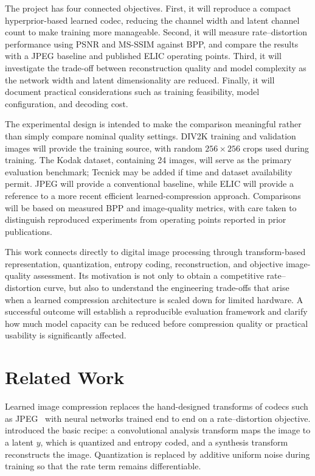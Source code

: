 \documentclass[11pt]{article}
\begin{document}
The project has four connected objectives. First, it will reproduce
a compact hyperprior-based learned codec, reducing the channel width
and latent channel count to make training more manageable. Second,
it will measure rate--distortion performance using PSNR and MS-SSIM
against BPP, and compare the results with a JPEG baseline and
published ELIC operating points. Third, it will investigate the
trade-off between reconstruction quality and model complexity as
the network width and latent dimensionality are reduced. Finally,
it will document practical considerations such as training
feasibility, model configuration, and decoding cost.

The experimental design is intended to make the comparison
meaningful rather than simply compare nominal quality settings.
DIV2K training and validation images will provide the training
source, with random $256 \times 256$ crops used during training.
The Kodak dataset, containing 24 images, will serve as the primary
evaluation benchmark; Tecnick may be added if time and dataset
availability permit. JPEG will provide a conventional baseline,
while ELIC will provide a reference to a more recent efficient
learned-compression approach. Comparisons will be based on measured
BPP and image-quality metrics, with care taken to distinguish
reproduced experiments from operating points reported in prior
publications.

This work connects directly to digital image processing through
transform-based representation, quantization, entropy coding,
reconstruction, and objective image-quality assessment. Its
motivation is not only to obtain a competitive rate--distortion
curve, but also to understand the engineering trade-offs that arise
when a learned compression architecture is scaled down for limited
hardware. A successful outcome will establish a reproducible
evaluation framework and clarify how much model capacity can be
reduced before compression quality or practical usability is
significantly affected.

\section{Related Work}
Learned image compression replaces the hand-designed transforms of codecs such as
JPEG~\citep{wallace1992jpeg} with neural networks trained end to end on a
rate--distortion objective. \citet{balle2017endtoend} introduced the basic recipe: a
convolutional analysis transform maps the image to a latent $y$, which is quantized
and entropy coded, and a synthesis transform reconstructs the image. Quantization is
replaced by additive uniform noise during training so that the rate term remains
differentiable.
\end{document}
